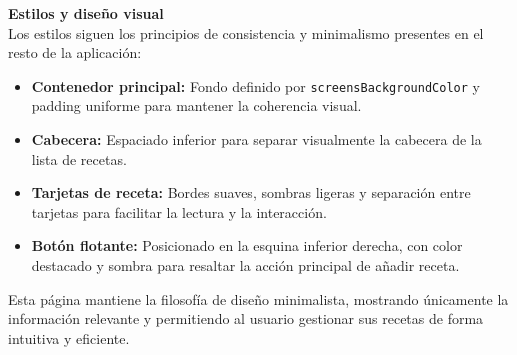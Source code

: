 \documentclass[twoside, openright, 11pt]{report}
\begin{document}
					\textbf{Estilos y diseño visual}\\
					Los estilos siguen los principios de consistencia y minimalismo presentes en el resto de la aplicación:
					
					\begin{itemize}
						\item \textbf{Contenedor principal:} Fondo definido por \texttt{screensBackgroundColor} y padding uniforme para mantener la coherencia visual.
						\item \textbf{Cabecera:} Espaciado inferior para separar visualmente la cabecera de la lista de recetas.
						\item \textbf{Tarjetas de receta:} Bordes suaves, sombras ligeras y separación entre tarjetas para facilitar la lectura y la interacción.
						\item \textbf{Botón flotante:} Posicionado en la esquina inferior derecha, con color destacado y sombra para resaltar la acción principal de añadir receta.
					\end{itemize}
					
					Esta página mantiene la filosofía de diseño minimalista, mostrando únicamente la información relevante y permitiendo al usuario gestionar sus recetas de forma intuitiva y eficiente.
					
\end{document}
